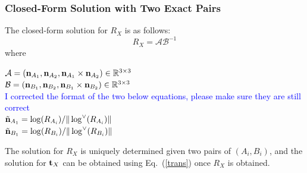 \documentclass[twocolumn,10pt]{asme2ej}
\newcommand{\nn}{{\bf n}}
\newcommand{\ttt}{{\bf t}}
\begin{document}
\subsubsection{Closed-Form Solution with Two Exact Pairs}
The closed-form solution for $R_{X}$ is as follows:
\begin{equation}
R_{X} = \mathcal{A}\mathcal{B}^{-1}
\label{Lie_Rotation}
\end{equation}
where\\

\begin{center}
$\mathcal{A} = (\nn_{A_{1}}, \nn_{A_{2}}, \nn_{A_{1}} \times \nn_{A_{2}}) \in \mathbb{R}^{3 \times 3}$\\
 $\mathcal{B} = (\nn_{B_{1}}, \nn_{B_{2}}, \nn_{B_{1}} \times \nn_{B_{2}}) \in \mathbb{R}^{3 \times 3} $\\
\textcolor{blue}{I corrected the format of the two below equations, please make sure they are still correct\\}
$\tilde{\nn}_{A_{1}} = \log(R_{A_{i}})/\|\log^\vee(R_{A_i})\|$\\
$\tilde{\nn}_{B_{1}} = \log(R_{B_{i}})/\|\log^\vee(R_{B_i})\|$
\end{center}
The solution for $R_X$ is uniquely determined given two pairs of $(A_i, B_i)$, and the solution for $\ttt_{X}$ can be obtained using Eq.~(\ref{trans}) once $R_{X}$ is obtained.\\

\end{document}

